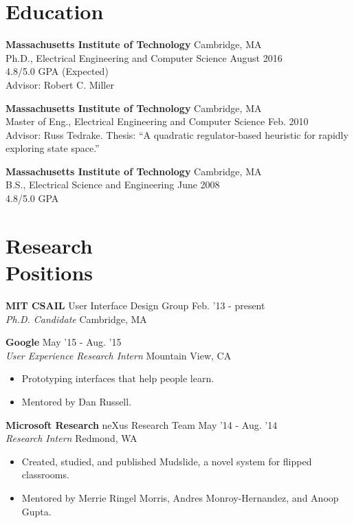 \documentclass[margin]{res}
\begin{document}
\begin{resume}

\section{Education} 
{\bf Massachusetts Institute of Technology} \hfill Cambridge, MA \\
Ph.D., Electrical Engineering and Computer Science \hfill August 2016\\
4.8/5.0 GPA  \hfill (Expected) \\
Advisor: Robert C. Miller 

{\bf Massachusetts Institute of Technology} \hfill Cambridge, MA \\
Master of Eng., Electrical Engineering and Computer Science \hfill Feb. 2010 \\
Advisor: Russ Tedrake. Thesis: ``A quadratic regulator-based heuristic for rapidly exploring state space.''

{\bf Massachusetts Institute of Technology} \hfill Cambridge, MA \\
B.S., Electrical Science and Engineering \hfill June 2008 \\
4.8/5.0 GPA

\section{Research \\Positions}

{\bf MIT CSAIL} User Interface Design Group \hfill Feb. '13 - present \\ 
{\it Ph.D. Candidate} \hfill Cambridge, MA 

{\bf Google} \hfill May '15 - Aug. '15 \\ {\it User Experience Research Intern} \hfill Mountain View, CA 
 \begin{itemize} \itemsep -2pt  %
 \item Prototyping interfaces that help people learn.
\item Mentored by Dan Russell. 
\end{itemize}

{\bf Microsoft Research} neXus Research Team \hfill May '14 - Aug. '14 \\ {\it Research Intern} \hfill Redmond, WA 
 \begin{itemize} \itemsep -2pt  %
 \item Created, studied, and published Mudslide, a novel system for flipped classrooms.
\item Mentored by Merrie Ringel Morris, Andres Monroy-Hernandez, and Anoop Gupta. 
\end{itemize}


\end{resume}
\end{document}
